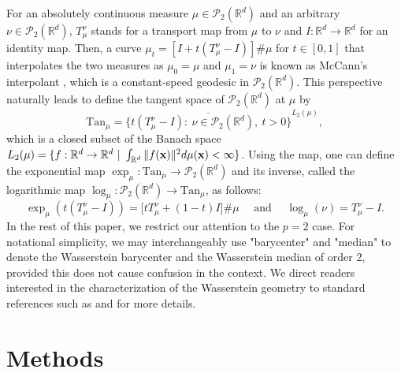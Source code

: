 \documentclass[11pt]{article}
\newcommand{\calP}{\mathcal{P}}
\newcommand{\Rd}{\mathbb{R}^d}
\begin{document}
For an absolutely continuous measure $\mu \in \calP_2(\Rd)$ and an arbitrary $\nu \in \calP_2(\Rd)$, $T_\mu^\nu$ stands for a  transport map from $\mu$ to $\nu$  and $I:\Rd \rightarrow \Rd$ for an identity map. Then, a curve $\mu_t = [I + t (T_\mu^\nu - I)]\#\mu $ for $t \in [0,1]$ that interpolates the two measures as $\mu_0 = \mu$ and $\mu_1 = \nu$ is known as McCann's interpolant \citep{mccann_1997_ConvexityPrincipleInteracting}, which is a constant-speed geodesic in $\calP_2 (\Rd)$. This perspective naturally leads to define the tangent space of $\calP_2(\Rd)$ at $\mu$ by
\begin{equation*}    
	\text{Tan}_\mu = \overline{
		\lbrace t (T_\mu^\nu - I) :~\nu \in \calP_2 (\Rd), ~t > 0\rbrace
	}^{L_2(\mu)}, 
\end{equation*}
which is a closed subset of the Banach space $L_2 (\mu) = \lbrace f:\Rd\rightarrow\Rd~\vert~\int_{\Rd} \|f({\bf x})\|^2 d\mu({\bf x}) < \infty\rbrace$. Using the map, one can define the  exponential map $\exp_\mu :\text{Tan}_\mu \rightarrow \calP_2(\Rd)$ and its inverse, called the logarithmic map $\log_\mu : \calP_2(\Rd) \rightarrow \text{Tan}_\mu$, as follows:
\begin{equation*}
	\exp_\mu (t(T_\mu^\nu - I)) = \lbrack t T_\mu^\nu + (1-t)I \rbrack\#\mu \quad \textrm{ and }\quad \log_\mu(\nu) = T_{\mu}^\nu - I.
\end{equation*}
In the rest of this paper, we restrict our attention to the $p=2$ case. For notational simplicity, we may interchangeably use "barycenter" and "median" to denote the Wasserstein barycenter and the Wasserstein median of order 2, provided this does not cause confusion in the context. We direct readers interested in the  characterization of the Wasserstein geometry to standard references such as \cite{villani_2003_TopicsOptimalTransportation} and \cite{ambrosio_2005_GradientFlowsMetric} for more details.





\section{Methods}\label{sec:main}
\end{document}
